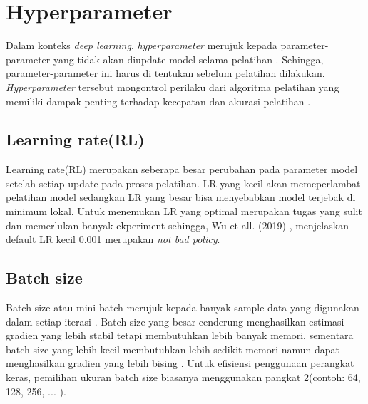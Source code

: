 \section{Hyperparameter}
\noindent Dalam konteks \textit{deep learning}, \textit{hyperparameter} merujuk kepada parameter-parameter yang tidak akan diupdate model selama pelatihan \cite{yu_hyper-parameter_2020}.  Sehingga, parameter-parameter ini harus di tentukan sebelum pelatihan dilakukan. \textit{Hyperparameter} tersebut mongontrol perilaku dari algoritma pelatihan yang memiliki dampak penting terhadap kecepatan dan akurasi pelatihan \cite{goodfellow_deep_2016}.  

\subsection{Learning rate(RL)}
\noindent Learning rate(RL) merupakan seberapa besar perubahan pada parameter model setelah setiap update pada proses pelatihan. LR yang kecil akan memeperlambat pelatihan model sedangkan LR yang besar bisa menyebabkan model terjebak di minimum lokal. Untuk menemukan LR yang optimal merupakan tugas yang sulit dan memerlukan banyak ekperiment sehingga, Wu et all. (2019) \cite{wu_demystifying_2019}, menjelaskan default LR kecil 0.001 merupakan \textit{not bad policy}.

\subsection{Batch size }
\noindent Batch size atau mini batch merujuk kepada banyak sample data yang digunakan dalam setiap iterasi \cite{devarakonda_adabatch_2017}.  Batch size yang besar cenderung menghasilkan estimasi gradien yang lebih stabil tetapi membutuhkan lebih banyak memori, sementara batch size yang lebih kecil membutuhkan lebih sedikit memori namun dapat menghasilkan gradien yang lebih bising \cite{goodfellow_deep_2016}. Untuk efisiensi penggunaan perangkat keras, pemilihan ukuran batch size biasanya menggunakan pangkat 2(contoh: 64, 128, 256, ... )\cite{bishop_deep_2024}.


